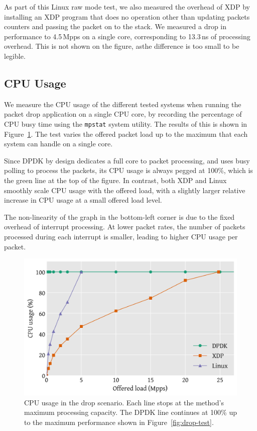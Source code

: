 \documentclass[sigconf]{acmart}
\begin{document}
As part of this Linux raw mode test, we also measured the overhead of XDP by
installing an XDP program that does no operation other than updating packets
counters and passing the packet on to the stack. We measured a drop in
performance to 4.5\,Mpps on a single core, corresponding to 13.3\,ns of
processing overhead. This is not shown on the figure, asthe difference is too
small to be legible.

\subsection{CPU Usage}
\label{sec:cpu-usage}

We measure the CPU usage of the different tested systems when running the packet
drop application on a single CPU core, by recording the percentage of CPU busy
time using the \texttt{mpstat} system utility. The results of this is shown in
Figure~\ref{fig:drop-cpu}. The test varies the offered packet load up to the
maximum that each system can handle on a single core.

Since DPDK by design dedicates a full core to packet processing, and uses busy
polling to process the packets, its CPU usage is always pegged at 100\%, which
is the green line at the top of the figure. In contrast, both XDP and Linux
smoothly scale CPU usage with the offered load, with a slightly larger relative
increase in CPU usage at a small offered load level.

The non-linearity of the graph in the bottom-left corner is due to the fixed
overhead of interrupt processing. At lower packet rates, the number of packets
processed during each interrupt is smaller, leading to higher CPU usage per
packet.

\begin{figure}[t]
\centering
\includegraphics[width=\linewidth]{figures/drop-cpu.pdf}
\caption{\label{fig:drop-cpu} CPU usage in the drop scenario. Each line stops at
  the method's maximum processing capacity. The DPDK line continues at 100\% up
  to the maximum performance shown in Figure~\ref{fig:drop-test}.}
\end{figure}
\end{document}
